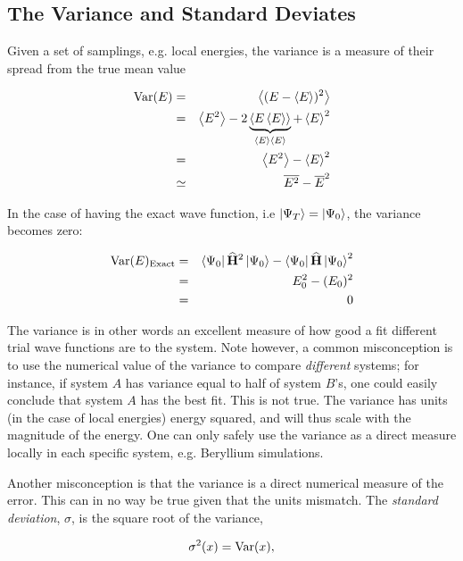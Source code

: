 \subsection{The Variance and Standard Deviates}
\label{sec:varAndSTD}

Given a set of samplings, e.g. local energies, the variance is a measure of their spread from the true mean value

\begin{eqnarray}
\label{eq:variance}
\mathrm{Var}(E) &=& \left< (E-\left< E \right>)^2 \right> \nonumber\\
        &=& \left< E^2 \right> - 2\underbrace{\left< E\left< E \right> \right>}_{\left< E \right>\left< E \right>} + \left< E \right>^2 \nonumber\\
        &=& \left< E^2 \right> - \left< E \right>^2 \\
        &\simeq& \overline{E^2} - \overline{E}^2
\end{eqnarray}

In the case of having the exact wave function, i.e $\left| \Psi_T \right> = \left| \Psi_0 \right>$, the variance becomes zero:

\begin{eqnarray*}
\label{eq:varianceZeroExact}
\mathrm{Var}(E)_\mathrm{Exact} &=& \left< \Psi_0 \right|{\bf\widehat{H}}^2\left| \Psi_0 \right> -  \left< \Psi_0 \right|{\bf\widehat{H}}\left| \Psi_0 \right>^2 \\
		        &=& E_0^2 - (E_0)^2 \\
		        &=& 0
\end{eqnarray*}

The variance is in other words an excellent measure of how good a fit different trial wave functions are to the system. Note however, a common misconception is to use the numerical value of the variance to compare \textit{different} systems; for instance, if system $A$ has variance equal to half of system $B$'s, one could easily conclude that system $A$ has the best fit. This is not true. The variance has units (in the case of local energies) energy squared, and will thus scale with the magnitude of the energy. One can only safely use the variance as a direct measure locally in each specific system, e.g. Beryllium simulations.

Another misconception is that the variance is a direct numerical measure of the error. This can in no way be true given that the units mismatch. The \textit{standard deviation}, $\sigma$, is the square root of the variance,

\begin{equation}
\label{eq:stdNaive}
 \sigma^2(x) = \mathrm{Var}(x),
\end{equation}


